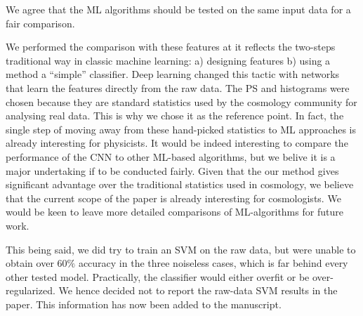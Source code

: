 \documentclass[12pt,a4paper]{article}
\newcommand{\nati}[1]{{\color[rgb]{.1,.6,.1}{NP: #1}}}
\newcommand{\1}{\b{1}}              %
\newcommand{\0}{\b{0}}              %
\begin{document}
We agree that the ML algorithms should be tested on the same input data for a fair comparison.

We performed the comparison with these features at it reflects the two-steps traditional way in classic machine learning: a) designing features b) using a method a ``simple'' classifier. Deep learning changed this tactic with networks that learn the features directly from the raw data.
The PS and histograms were chosen because they are standard statistics used by the cosmology community for analysing real data.
This is why we chose it as the reference point.
In fact, the single step of moving away from these hand-picked statistics to ML approaches is already interesting for physicists.
It would be indeed interesting to compare the performance of the CNN to other ML-based algorithms, but we belive it is a major undertaking if to be conducted fairly.
Given that the our method gives significant advantage over the traditional statistics used in cosmology, we believe that the current scope of the paper is already interesting for cosmologists.
We would be keen to leave more detailed comparisons of ML-algorithms for future work.


This being said, we did try to train an SVM on the raw data, but were unable to obtain over $60\%$ accuracy in the three noiseless cases, which is far behind every other tested model.
Practically, the classifier would either overfit or be over-regularized.
We hence decided not to report the raw-data SVM results in the paper.
This information has now been added to the manuscript.
\end{document}

